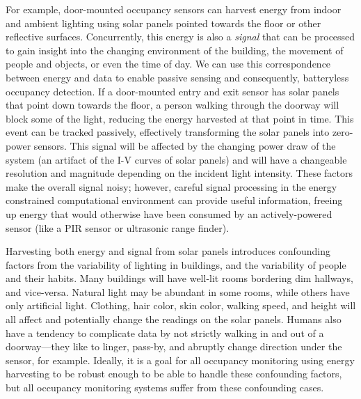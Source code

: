 For example, door-mounted occupancy sensors can harvest energy from indoor and ambient lighting using solar panels pointed towards the floor or other reflective surfaces.
Concurrently, this energy is also a \textit{signal} that can be processed to gain insight into the changing environment of the building, the movement of people and objects, or even the time of day.
We can use this correspondence between energy and data to enable passive sensing and consequently, batteryless occupancy detection.
If a door-mounted entry and exit sensor has solar panels that point down towards the floor, a person walking through the doorway will block some of the light, reducing the energy harvested at that point in time.
This event can be tracked passively, effectively transforming the solar panels into zero-power sensors.
This signal will be affected by the changing power draw of the system (an artifact of the I-V curves of solar panels) and will have a changeable resolution and magnitude depending on the incident light intensity.
These factors make the overall signal noisy; however, careful signal processing in the energy constrained computational environment can provide useful information, freeing up energy that would otherwise have been consumed by an actively-powered sensor (like a PIR sensor or ultrasonic range finder).

Harvesting both energy and signal from solar panels introduces confounding factors from the variability of lighting in buildings, and the variability of people and their habits.
Many buildings will have well-lit rooms bordering dim hallways, and vice-versa.
Natural light may be abundant in some rooms, while others have only artificial light.
Clothing, hair color, skin color, walking speed, and height will all affect and potentially change the readings on the solar panels. Humans also have a tendency to complicate data by not strictly walking in and out of a doorway---they like to linger, pass-by, and abruptly change direction under the sensor, for example.
Ideally, it is a goal for all occupancy monitoring using energy harvesting to be robust enough to be able to handle these confounding factors, but all occupancy monitoring systems suffer from these confounding cases.%





